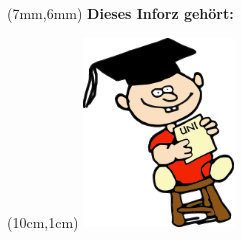\thispagestyle{empty}

\begin{textblock*}{10cm}(7mm,6mm)
\normalsize \textbf{Dieses Inforz gehört:}
\end{textblock*}

\begin{textblock*}{4cm}(10cm,1cm)
\includegraphics[width=4cm]{../grafik/wesen/wesen_uni}
\end{textblock*}
